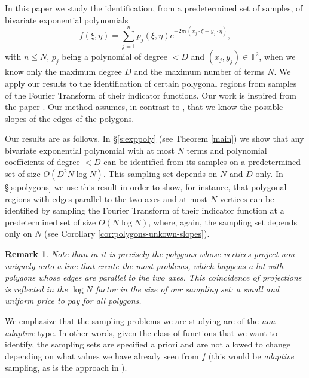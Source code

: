\documentclass[12pt,a4paper,oneside]{amsart}
\newtheorem{remark}{Remark}[section]
\theoremstyle{definition}
\newcommand{\TT}{{\mathbb T}}
\newcommand{\red}[1]{{#1}}
\newcounter{rem}
\begin{document}
In this paper we study the identification, \red{from a predetermined set of samples,} of bivariate exponential polynomials
\red{
$$
f(\xi,\eta)= \sum_{j=1}^n p_j (\xi,\eta) e^{-2\pi i (x_j \cdot \xi + y_j \cdot \eta )},
$$
with $n \le N$, $p_j $ being a polynomial of degree $< D$ and $(x_j, y_j) \in \TT^2$, when we know only the maximum degree $D$ and the maximum number of terms $N$. 
}
We apply our results to the identification of certain polygonal regions \red{from samples of the Fourier Transform of their indicator functions}. Our work is inspired from the paper \cite{wischerhoff2016reconstruction}. Our method assumes, in contrast to \cite{wischerhoff2016reconstruction}, that we know the possible slopes of the edges of the polygons.

Our results are as follows.
In \S \ref{s:exppoly} (see Theorem \ref{main}) we show that any bivariate exponential polynomial with at most $N$ terms and polynomial coefficients of degree $<D$ can be identified from its samples on a \red{predetermined} set of size $O(D^2 N \log N)$. This sampling set depends on $N$ and $D$ only. In \S \ref{s:polygons} we use this result in order to show, for instance, that polygonal regions with edges parallel to the two axes and at most $N$ vertices can be identified by sampling the Fourier Transform of their indicator function at a predetermined set of size $O(N \log N)$, where, again, the sampling set depends only on $N$ (see Corollary \ref{cor:polygons-unkown-slopes}).

\begin{remark}
Note than in \cite{wischerhoff2016reconstruction} it is precisely the polygons whose vertices project non-uniquely onto a line that create the most problems, which happens a lot with polygons whose edges are parallel to the two axes. This coincidence of projections is reflected in the $\log N$ factor in the size of our sampling set: a small and uniform price to pay for all polygons.
\end{remark}

We emphasize that the sampling problems we are studying are of the \textit{non-adaptive} type. In other words, given the class of functions that we want to identify, the sampling sets are specified a priori and are not allowed to change depending on what values we have already seen from $f$ (this would be \textit{adaptive} sampling, as is the approach in \cite{wischerhoff2016reconstruction}).
\end{document}
